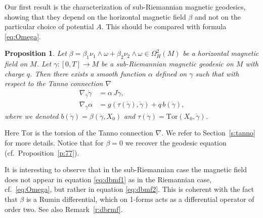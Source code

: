 \documentclass{amsart}
\theoremstyle{plain}
\newtheorem{proposition}[theorem]{Proposition}
\theoremstyle{definition}
\theoremstyle{remark}
\newcommand{\Tor}{\mathrm{Tor}}
\newcommand{\sr}{sub-{R}ie\-man\-nian }
\newcommand{\B}{\beta}
\begin{document}
 Our first result is the characterization of sub-Riemannian magnetic geodesics, showing that they depend on the horizontal magnetic field $\beta$ and not on the particular choice of potential $A$. This should be compared with formula \eqref{eq:Omega}.

 

\begin{proposition} \label{p:maggeo}
Let $\B=\B_{1}\nu_1\wedge\omega + \B_{2}\nu_2\wedge\omega\in\Omega^2_H(M)$ be a horizontal magnetic field on $M$. Let $\gamma:[0,T]\to M$ be a sub-Riemannian magnetic geodesic on $M$ with charge $q$. Then there exists a smooth function $\alpha$ defined on $\gamma$ such that with respect to the Tanno connection $\nabla$
\begin{align}
\nabla_{\dot\gamma}\dot \gamma &= \alpha \,J\dot \gamma, \label{eq:dbmf1}\\
\nabla_{\dot \gamma} \alpha &= g(\tau(\dot \gamma),\dot \gamma)+q\, b(\dot \gamma), \label{eq:dbmf2}
\end{align}
where we denoted $b(\dot \gamma)=\beta(\dot \gamma,X_{0})$ and $\tau(\dot \gamma)=\Tor(X_{0},\dot \gamma)$.
\end{proposition}


Here $\mathrm{Tor}$ is the torsion of the Tanno connection $\nabla$. We refer to Section~\ref{s:tanno} for more details. Notice that for $\beta=0$ we recover the geodesic equation (cf.\ Proposition~\ref{p:77}).

 It is interesting to observe that in the \sr case the magnetic field does not appear in equation \eqref{eq:dbmf1} as in the Riemannian case, cf.\  \eqref{eq:Omega}, but rather in equation \eqref{eq:dbmf2}. This is coherent with the fact that $\beta$ is a Rumin differential, which on 1-forms acts as a differential operator of order two. See also Remark~\ref{r:dbrmf}. 
 
\end{document}
